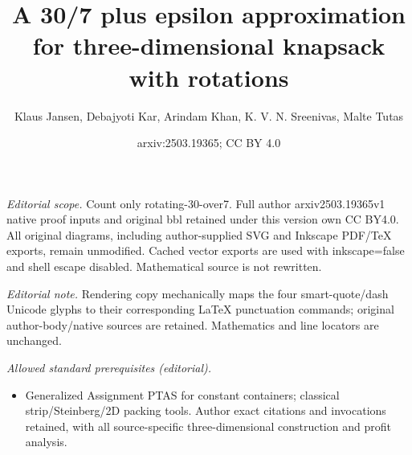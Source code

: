 \documentclass[10pt,a4paper]{amsart}
\title{A 30/7 plus epsilon approximation for three-dimensional knapsack with rotations}
\author{Klaus Jansen, Debajyoti Kar, Arindam Khan, K. V. N. Sreenivas, Malte Tutas}
\date{arxiv:2503.19365; CC BY 4.0}
\theoremstyle{definition}
\begin{document}
\maketitle
\noindent\textit{Editorial scope.} Count only rotating-30-over7. Full author arxiv2503.19365v1 native proof inputs and original bbl retained under this version own CC BY4.0. All original diagrams, including author-supplied SVG and Inkscape PDF/TeX exports, remain unmodified. Cached vector exports are used with inkscape=false and shell escape disabled. Mathematical source is not rewritten.\par\medskip
\noindent\textit{Editorial note.} Rendering copy mechanically maps the four smart-quote/dash Unicode glyphs to their corresponding LaTeX punctuation commands; original author-body/native sources are retained. Mathematics and line locators are unchanged.\par\medskip
\noindent\textit{Allowed standard prerequisites (editorial).}\begin{itemize}
\item Generalized Assignment PTAS for constant containers; classical strip/Steinberg/2D packing tools. Author exact citations and invocations retained, with all source-specific three-dimensional construction and profit analysis.
\end{itemize}\medskip
\usetikzlibrary{patterns}
\usetikzlibrary{decorations,arrows}
\usetikzlibrary{decorations.pathmorphing}
\usetikzlibrary{decorations.text}





\end{document}
